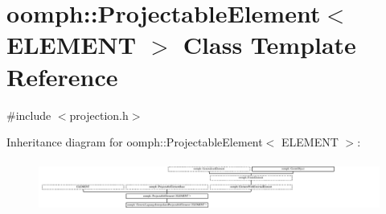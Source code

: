 \hypertarget{classoomph_1_1ProjectableElement}{}\section{oomph\+:\+:Projectable\+Element$<$ E\+L\+E\+M\+E\+NT $>$ Class Template Reference}
\label{classoomph_1_1ProjectableElement}


{\ttfamily \#include $<$projection.\+h$>$}

Inheritance diagram for oomph\+:\+:Projectable\+Element$<$ E\+L\+E\+M\+E\+NT $>$\+:\begin{figure}[H]
\begin{center}
\leavevmode
\includegraphics[height=1.674641cm]{classoomph_1_1ProjectableElement}
\end{center}
\end{figure}
